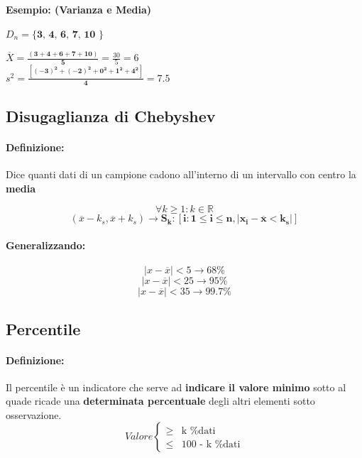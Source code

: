 \documentclass[]{article}
\newcommand{\definizione}{\paragraph{Definizione:}}
\begin{document}
    \paragraph{Esempio: (Varianza e Media)} $D_n = \textbf{\{ 3, 4, 6, 7, 10 \}}$ \\
    \linebreak[2]
 
     $ \overline{X} = \boldsymbol{\frac{( 3 + 4 + 6 + 7 + 10)}{5}} = \frac{30}{5} = 6 $ \\

     $ s^2 = \boldsymbol{\frac{[ (-3)^2 + (-2)^2 + 0^2 + 1^2 + 4^2 ]}{4}} = 7.5 $ 

    \subsection{Disugaglianza di Chebyshev}
    \definizione Dice quanti dati di un campione cadono all'interno di un intervallo con centro la \textbf{media}

    \[ \forall k \geq 1 : k \in \mathbb{R} \]
    \[ (\overline{x} - k_s, \overline{x} + k_s) \longrightarrow \boldsymbol{S_k : [i : 1 \leq i \leq n, |x_i - \overline{x} < k_s|]} \]
    \paragraph{Generalizzando:}
    \[ |x - \overline{x}| < 5 \longrightarrow 68\% \]
    \[ |x - \overline{x}| < 25 \longrightarrow 95\% \]
    \[ |x - \overline{x}| < 35 \longrightarrow 99.7\% \]
    \subsection{Percentile}
    \definizione Il percentile è un indicatore che serve ad \textbf{indicare il valore minimo} sotto al quade ricade una \textbf{determinata percentuale} degli altri elementi sotto osservazione.
    \begin{equation*}
        Valore
        \begin{cases}
            \geq & \text{k \% dati} \\
            \leq & \text{100 - k \% dati}
        \end{cases}
    \end{equation*}
     \\
    \linebreak[3]
\end{document}
